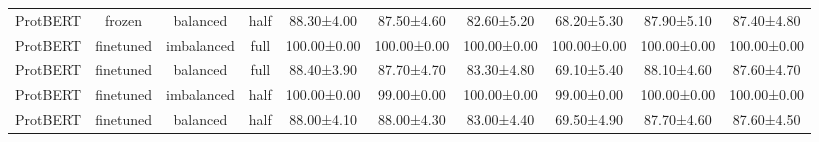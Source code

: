 \begin{tabular}{lccccccccc}
    ProtBERT &         frozen &   balanced &      half &  88.30±4.00 &  87.50±4.60 &  82.60±5.20 &  68.20±5.30 &  87.90±5.10 &  87.40±4.80 \\
    ProtBERT &      finetuned & imbalanced &      full & 100.00±0.00 & 100.00±0.00 & 100.00±0.00 & 100.00±0.00 & 100.00±0.00 & 100.00±0.00 \\
    ProtBERT &      finetuned &   balanced &      full &  88.40±3.90 &  87.70±4.70 &  83.30±4.80 &  69.10±5.40 &  88.10±4.60 &  87.60±4.70 \\
    ProtBERT &      finetuned & imbalanced &      half & 100.00±0.00 &  99.00±0.00 & 100.00±0.00 &  99.00±0.00 & 100.00±0.00 & 100.00±0.00 \\
    ProtBERT &      finetuned &   balanced &      half &  88.00±4.10 &  88.00±4.30 &  83.00±4.40 &  69.50±4.90 &  87.70±4.60 &  87.60±4.50 \\
\bottomrule
\end{tabular}
